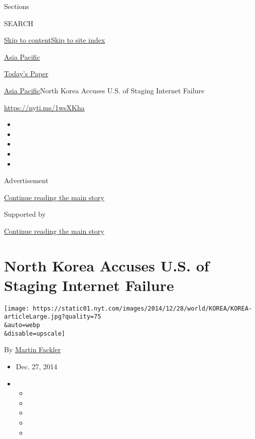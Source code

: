 Sections

SEARCH

\protect\hyperlink{site-content}{Skip to
content}\protect\hyperlink{site-index}{Skip to site index}

\href{https://www.nytimes.com/section/world/asia}{Asia Pacific}

\href{https://myaccount.nytimes.com/auth/login?response_type=cookie\&client_id=vi}{}

\href{https://www.nytimes.com/section/todayspaper}{Today's Paper}

\href{/section/world/asia}{Asia Pacific}\textbar{}North Korea Accuses
U.S. of Staging Internet Failure

\url{https://nyti.ms/1wsXKha}

\begin{itemize}
\item
\item
\item
\item
\item
\end{itemize}

Advertisement

\protect\hyperlink{after-top}{Continue reading the main story}

Supported by

\protect\hyperlink{after-sponsor}{Continue reading the main story}

\hypertarget{north-korea-accuses-us-of-staging-internet-failure}{%
\section{North Korea Accuses U.S. of Staging Internet
Failure}\label{north-korea-accuses-us-of-staging-internet-failure}}

\texttt{[image: https://static01.nyt.com/images/2014/12/28/world/KOREA/KOREA-articleLarge.jpg?quality=75\\\&auto=webp\\\&disable=upscale]}

By \href{http://www.nytimes.com/by/martin-fackler}{Martin Fackler}

\begin{itemize}
\item
  Dec. 27, 2014
\item
  \begin{itemize}
  \item
  \item
  \item
  \item
  \item
  \end{itemize}
\end{itemize}

